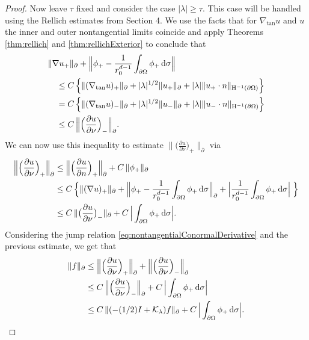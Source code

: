 \begin{proof}
  Now leave $\tau$ fixed and consider the case $|\lambda| \geq \tau$.
  This case will be handled using the Rellich estimates from Section 4.
  We use the facts that for $\nabla_{\mathrm{tan}} u$ and $u$ the inner and outer nontangential limits coincide and apply Theorems \ref{thm:rellich} and \ref{thm:rellichExterior} to conclude that
  \begin{align*}
    &\|\nabla u_+ \|_\partial + \Big\| \phi_+ - \frac{1}{r_0^{d - 1}}\int_{\partial\Omega} \phi_+ \, {\operatorname{d}\!{\sigma}} \Big\| \\
    &\quad\leq C\, \Big\{ \|( \nabla_{\mathrm{tan}} u)_+ \|_\partial + |\lambda|^{1/2} \|u_+\|_\partial + |\lambda| \| u_+\cdot n\|_{\mathrm{H}^{-1}(\partial\Omega)} \Big\} \\
    &\quad = C\, \Big\{ \|( \nabla_{\mathrm{tan}} u)_- \|_\partial + |\lambda|^{1/2} \|u_-\|_\partial + |\lambda| \| u_-\cdot n\|_{\mathrm{H}^{-1}(\partial\Omega)} \Big\} \\
    &\quad\leq C\, \Big\| \Big(\frac{\partial u}{\partial \nu} \Big)_- \Big\|_\partial.
  \end{align*}
  We can now use this inequality to estimate $\| \big( \frac{\partial u}{\partial \nu} \big)_+ \|_\partial$ via
  \begin{align*}
    \Big\| \Big( \frac{\partial u}{\partial \nu} \Big)_+ \Big\|_\partial
    &\leq \Big\|\Big(\frac{\partial u}{\partial n} \Big)_+ \Big\|_\partial + C\, \| \phi_+ \|_\partial \\
    &\leq C\,  \Big\{  \| (\nabla u)_+ \|_\partial + \Big\|\phi_+ - \frac{1}{r_0^{d - 1}} \int_{\partial\Omega} \phi_+ \, {\operatorname{d}\!{\sigma}} \Big\|_\partial + \Big| \frac{1}{r_0^{d - 1}} \int_{\partial\Omega} \phi_+ \, {\operatorname{d}\!{\sigma}} \Big| \; \Big\}\\
    &\leq C\,  \| \big(\frac{\partial u}{\partial \nu} \big)_- \|_\partial + C \, \Big| \int_{\partial\Omega} \phi_+ \, {\operatorname{d}\!{\sigma}} \Big|.
  \end{align*}
  Considering the jump relation \eqref{eq:nontangentialConormalDerivative} and the previous estimate, we get that
  \begin{align}
    \|f \|_\partial 
    &\leq \Big\|\Big( \frac{\partial u}{\partial \nu} \Big)_+ \Big\|_\partial + \Big\| \Big( \frac{\partial u}{\partial \nu} \Big)_- \Big\|_\partial  \nonumber\\
    &\leq C \, \Big\| \Big( \frac{\partial u}{\partial \nu} \Big)_- \Big\|_\partial + C\, \Big| \int_{\partial\Omega} \phi_+ \d\sigma \Big| \nonumber\\
    \label{eq:estimatef}
    &\leq C \, \| (-(1/2)I + \K_\lambda) f \|_\partial + C \, \Big| \int_{\partial\Omega} \phi_+ \d\sigma \Big|.

\end{align}
\end{proof}
